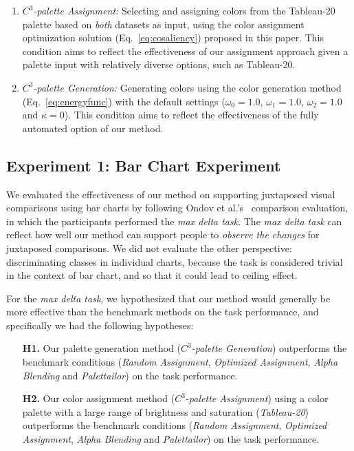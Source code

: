 \begin{enumerate}
     \item \emph{$C^3$-palette Assignment:} Selecting and assigning colors from the Tableau-20 palette based on \emph{both} datasets as input, using the color assignment optimization solution (Eq.~\ref{eq:cosaliency}) proposed in this paper. This condition aims to reflect the effectiveness of our assignment approach given a palette input with relatively diverse options, such as Tableau-20.
     \item \emph{$C^3$-palette Generation:} Generating colors using the color generation method (Eq.~\ref{eq:energyfunc}) with the default settings ($\omega_0=1.0$, $\omega_1=1.0$, $\omega_2=1.0$ and $\kappa=0$). This condition aims to reflect the effectiveness of the fully automated option of our method.
\end{enumerate}


\subsection{Experiment 1: Bar Chart Experiment}
\label{subsec:barchartExp}
We evaluated the effectiveness of our method on supporting juxtaposed visual comparisons using bar charts by following Ondov et al.'s~\cite{Ondov19} comparison evaluation, in which the participants performed the \emph{max delta task}. The \emph{max delta task} can reflect how well our method can support people to \emph{observe the changes} for juxtaposed comparisons. We did not evaluate the other perspective: discriminating classes in individual charts, because the task is considered trivial in the context of bar chart, and so that it could lead to ceiling effect.

For the \emph{max delta task}, we hypothesized that our method would generally be more effective than the benchmark methods on the task performance, and specifically we had the following hypotheses:
\begin{itemize}[noitemsep]
\setlength{\itemsep}{5pt}
    \item[\textbf{H1.}] Our palette generation method (\emph{$C^3$-palette Generation}) outperforms the benchmark conditions (\emph{Random Assignment}, \emph{Optimized Assignment}, \emph{Alpha Blending} and \emph{Palettailor}) on the task performance.
    \item [\textbf{H2.}] Our color assignment method (\emph{$C^3$-palette Assignment}) using a color palette with a large range of brightness and saturation (\emph{Tableau-20}) outperforms the benchmark conditions (\emph{Random Assignment}, \emph{Optimized Assignment}, \emph{Alpha Blending} and \emph{Palettailor}) on the task performance.
\end{itemize}

